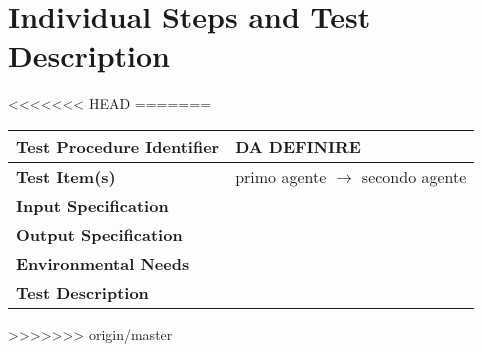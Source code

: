 \section{Individual Steps and Test Description}


<<<<<<< HEAD
=======
\begin{tabular}{l p{}}
    \hline
    \textbf{Test Procedure Identifier} & DA DEFINIRE \\
    \hline
    \textbf{Test Item(s)} & primo agente  $\rightarrow$ secondo agente \\
    \hline
    \textbf{Input Specification} & \\
    \hline
    \textbf{Output Specification} & \\
    \hline
    \textbf{Environmental Needs} &  \\
    \hline
    \textbf{Test Description} & \\
    \hline
\end{tabular}

>>>>>>> origin/master

